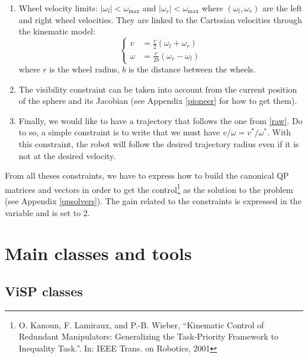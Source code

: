 \documentclass{ecnreport}
\begin{document}
\begin{enumerate}
 \item Wheel velocity limits: $|\omega_l| < \omega_{\max}$ and $|\omega_r| < \omega_{\max}$ where $(\omega_l, \omega_r)$ are the left and right wheel velocities. 
 They are linked to the Cartesian velocities through the kinematic model:
\begin{equation}\label{eq:wheels}
  \left\{\begin{array}{ll}
         v &= \frac{r}{2}(\omega_l + \omega_r) \\ \omega &=  \frac{r}{2b}(\omega_r - \omega_l)
        \end{array}\right.
\end{equation}where $r$ is the wheel radius, $b$ is the distance between the wheels.
\item The visibility constraint can be taken into account from the current position of the sphere and its Jacobian (see Appendix \ref{pioneer} for how to get them).
\item Finally, we would like to have a trajectory that follows the one from \eqref{raw}. Do to so, a simple constraint is to write that we must have $v/\omega = v^*/\omega^*$. With this constraint, 
the robot will follow the desired trajectory radius even if it is not at the desired velocity.
\end{enumerate}
From all theses constraints, we have to express how to build the canonical QP matrices and vectors in order to get the control\footnote{ O. Kanoun, F. Lamiraux, and P.-B. Wieber, “Kinematic Control of
	Redundant Manipulators: Generalizing the Task-Priority Framework to Inequality
	Task.”. In: IEEE Trans. on Robotics, 2001} as the solution to the problem (see Appendix \ref{qpsolvers}).
The gain related to the constraints is expressed in the variable  and is set to 2.

\appendix

\section{Main classes and tools}\label{sec:classes}

\subsection{ViSP classes}
\end{document}
